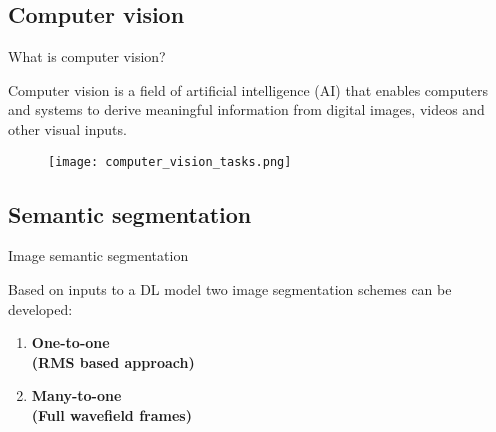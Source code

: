 \documentclass[10pt,aspectratio=169]{beamer} %
\begin{document}
\subsection{Computer vision}
\setcounter{subfigure}{0}
\begin{frame}{What is computer vision?}
	\begin{minipage}[c]{0.30\textwidth}
		Computer vision is a field of artificial intelligence (AI) that enables computers and systems to derive meaningful information from digital images, videos and other visual inputs. 
	\end{minipage}
\hfill
	\begin{minipage}[c]{0.65\textwidth}
			\begin{figure}
			\centering
			\texttt{[image: computer\_vision\_tasks.png]}
		\end{figure}
	\end{minipage}

\end{frame}

\subsection{Semantic segmentation}
\setcounter{subfigure}{0}
\begin{frame}{Image semantic segmentation}
	\begin{minipage}[l]{0.35\textwidth}
		Based on inputs to a DL model two image segmentation schemes can be developed:
		\medskip
		\begin{enumerate}			
			\item \textbf{One-to-one \\(RMS based approach)} 
			\medskip
			\item \textbf{Many-to-one \\(Full wavefield frames)}
		\end{enumerate}
	\end{minipage}
	\begin{minipage}[l]{0.6\textwidth}
		\begin{figure}
			\centering
			\qquad
			\qquad
			\\
			\qquad
			
		\end{figure}
	\end{minipage}	
\end{frame}
\end{document}
